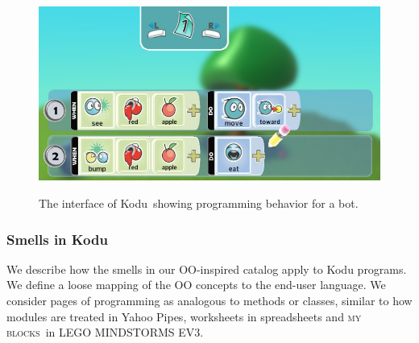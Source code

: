 \documentclass{sig-alternate}
\newcommand{\ms}{LEGO MINDSTORMS EV3}
\newcommand{\mbs}{\textsc{my blocks}}
\begin{document}
\begin{figure}[ht]
\caption{The interface of Kodu~showing programming behavior for a bot.}
\centering
\includegraphics[width=\columnwidth]{programmingui.png}
\label{fig:Kodu}
\end{figure}



\subsubsection{Smells in Kodu}
We describe how the smells in our OO-inspired catalog apply to Kodu programs. We define a loose mapping of the OO concepts to the end-user language. We consider pages of programming as analogous to methods or classes, similar to how modules are treated in Yahoo Pipes, worksheets in spreadsheets and \mbs~in \ms. 
\end{document}
